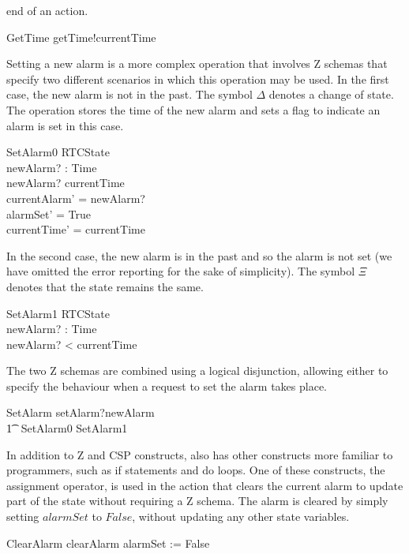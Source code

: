 \documentclass[a4paper,10pt]{report}
\begin{document}
end of an action.
%
\begin{circusaction}
  GetTime \circdef getTime!currentTime \then \Skip
\end{circusaction}
%
Setting a new alarm is a more complex operation that involves Z
schemas that specify two different scenarios in which this operation
may be used.
In the first case, the new alarm is not in the past.
The symbol $\Delta$ denotes a change of state.
The operation stores the time of the new alarm and sets a flag to
indicate an alarm is set in this case.
%
\begin{schema}{SetAlarm0}
  \Delta RTCState \\
  newAlarm?
  : Time \\
  \where newAlarm?
  \geq currentTime \\
  currentAlarm' = newAlarm?
  \\
  alarmSet' = True \\
  currentTime' = currentTime \\
\end{schema}
%
In the second case, the new alarm is in the past and so the alarm is
not set (we have omitted the error reporting for the sake of
simplicity).
The symbol $\Xi$ denotes that the state remains the same.
%
\begin{schema}{SetAlarm1}
  \Xi RTCState \\
  newAlarm?
  : Time \\
  \where newAlarm?
  < currentTime \\
\end{schema}
%
The two Z schemas are combined using a logical disjunction, allowing
either to specify the behaviour when a request to set the alarm takes
place.
%
\begin{circusaction}
  SetAlarm \circdef setAlarm?newAlarm \\
  \t1 \then\ \lschexpract SetAlarm0 \lor SetAlarm1 \rschexpract
\end{circusaction}
%
In addition to Z and CSP constructs, \Circus{} also has other
constructs more familiar to programmers, such as if statements and do
loops.
One of these constructs, the assignment operator, is used in the
action that clears the current alarm to update part of the state
without requiring a Z schema.
The alarm is cleared by simply setting $alarmSet$ to $False$, without
updating any other state variables.
%
\begin{circusaction}
  ClearAlarm \circdef clearAlarm \then alarmSet := False
\end{circusaction}
\end{document}

